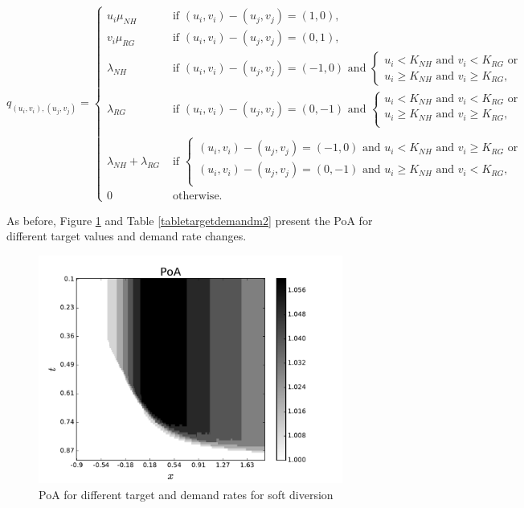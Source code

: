 \documentclass{article}
\begin{document}
\begin{equation}
q_{(u_i,v_i), (u_j, v_j)}=\begin{cases} u_i\mu_{NH} & \text{ if  } (u_i,v_i)-(u_j,v_j)=(1,0),\\
 v_i\mu_{RG} & \text{ if  } (u_i,v_i)-(u_j,v_j)=(0,1),\\
 \lambda_{NH} & \text{ if  } (u_i,v_i)-(u_j,v_j)=(-1,0) \text{ and }\left\{\begin{array}{l} u_i<K_{NH} \text{ and } v_i<K_{RG}  \text{ or } \\        u_i  \geq K_{NH} \text{ and } v_i  \geq K_{RG},\end{array}\right.\\
 \lambda_{RG} & \text{ if  } (u_i,v_i)-(u_j,v_j)=(0,-1) \text{ and }\left\{\begin{array}{l}u_i< K_{NH}\text{ and }v_i<K_{RG}\text{ or }\\u_i\geq K_{NH}\text{ and }v_i\geq K_{RG}, \\\end{array}\right.\\\\
\lambda_{NH}+\lambda_{RG} & \text{ if  } \left\{\begin{array}{l} (u_i,v_i)-(u_j,v_j)=(-1,0) \text{ and } u_i<K_{NH} \text{ and } v_i \geq K_{RG} \text{ or }\\ (u_i,v_i)-(u_j,v_j)=(0,-1) \text{ and } u_i \geq K_{NH} \text{ and } v_i < K_{RG}, \\\end{array}\right.\\
0 & \text{ otherwise}.
\end{cases}
\end{equation}


As before, Figure \ref{Fig:target_demand_model2} and Table \ref{tabletargetdemandm2} present the PoA for different target values and demand rate changes.

\begin{figure}[!htbp]
\begin{center}
\includegraphics[width=10cm]{./Images/model2targetvdemand.pdf}
\caption{PoA for different target and demand rates for soft diversion} \label{Fig:target_demand_model2}
\end{center}
\end{figure}
\end{document}
